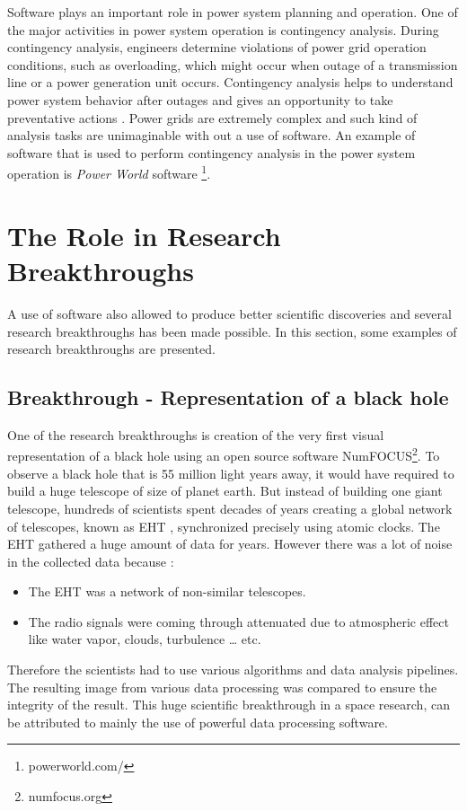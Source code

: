 Software plays an important role in power system planning and operation. One of the major activities in power system operation is contingency analysis. During contingency analysis, engineers determine violations of power grid operation conditions, such as overloading, which might occur when outage of a transmission line or a power generation unit occurs. Contingency analysis helps to understand power system behavior after outages and gives an opportunity to take preventative actions \citep{mishra2012contingency}. Power grids are extremely complex and such kind of analysis tasks are unimaginable with out a use of software. An example of software that is used to perform contingency analysis in the power system operation is \emph{Power World} software  \footnote{powerworld.com/}.  

%

\section{The Role in Research Breakthroughs  }
\label{sec:background:second_section}
A use of software also allowed to produce better scientific discoveries and several research breakthroughs has been made possible\citep{goble2014better}. In this section, some examples of research breakthroughs are presented.

\subsection{Breakthrough - Representation of a black hole  }

One of the research breakthroughs is creation of the very first visual representation of a black hole using an open source software NumFOCUS\footnote{numfocus.org}. To observe a black hole that is 55 million light years away, it would have required to build a huge telescope of size of planet earth. But instead of building one giant telescope, hundreds of scientists spent decades of years creating a global network of telescopes, known as \ac{EHT} \citep{enwiki:1052167868}, synchronized precisely using atomic clocks. The \ac{EHT} gathered a huge amount of data for years. However there was a lot of noise in the collected data because :


\vspace{-1mm}   %
	\begin{itemize}%
		\item The \ac{EHT} was a network of non-similar telescopes.
		\item The radio signals were coming through attenuated due to atmospheric effect like water vapor, clouds, turbulence … etc.
	\end{itemize}
Therefore the scientists had to use various algorithms and data analysis pipelines. The resulting image from various data processing was compared to ensure the integrity of the result. This huge scientific breakthrough in a space research, can be attributed to mainly the use of powerful data processing software. 

